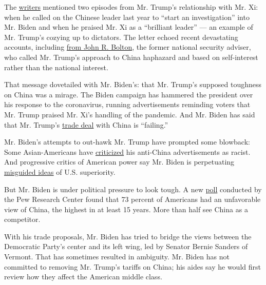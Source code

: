The
\href{https://www.nytimes3xbfgragh.onion/2020/08/20/us/politics/republican-national-security-biden.html}{writers}
mentioned two episodes from Mr. Trump's relationship with Mr. Xi: when
he called on the Chinese leader last year to ``start an investigation''
into Mr. Biden and when he praised Mr. Xi as a ``brilliant leader'' ---
an example of Mr. Trump's cozying up to dictators. The letter echoed
recent devastating accounts, including
\href{https://www.wsj.com/articles/john-bolton-the-scandal-of-trumps-china-policy-11592419564}{from
John R. Bolton}, the former national security adviser, who called Mr.
Trump's approach to China haphazard and based on self-interest rather
than the national interest.

That message dovetailed with Mr. Biden's: that Mr. Trump's supposed
toughness on China was a mirage. The Biden campaign has hammered the
president over his response to the coronavirus, running advertisements
reminding voters that Mr. Trump praised Mr. Xi's handling of the
pandemic. And Mr. Biden has said that Mr. Trump's
\href{https://www.reuters.com/article/us-usa-election-china/biden-says-trumps-china-trade-deal-is-failing-badly-idUSKCN25131X}{trade
deal} with China is ``failing.''

Mr. Biden's attempts to out-hawk Mr. Trump have prompted some blowback:
Some Asian-Americans have
\href{https://www.politico.com/news/2020/04/23/biden-ad-exposes-left-rift-china-202241}{criticized}
his anti-China advertisements as racist. And progressive critics of
American power say Mr. Biden is perpetuating
\href{https://quincyinst.org/2020/03/09/why-joe-bidens-foreign-policy-vision-isnt-so-visionary/}{misguided
ideas} of U.S. superiority.

But Mr. Biden is under political pressure to look tough. A new
\href{https://www.pewresearch.org/global/2020/07/30/americans-fault-china-for-its-role-in-the-spread-of-covid-19/?utm_source=AdaptiveMailer\&utm_medium=email\&utm_campaign=20-08-03\%20US\%20Views\%20of\%20China\%202\%20Gen\%20Distr\&org=982\&lvl=100\&ite=6786\&lea=1495217\&ctr=0\&par=1\&trk=}{poll}
conducted by the Pew Research Center found that 73 percent of Americans
had an unfavorable view of China, the highest in at least 15 years. More
than half see China as a competitor.

With his trade proposals, Mr. Biden has tried to bridge the views
between the Democratic Party's center and its left wing, led by Senator
Bernie Sanders of Vermont. That has sometimes resulted in ambiguity. Mr.
Biden has not committed to removing Mr. Trump's tariffs on China; his
aides say he would first review how they affect the American middle
class.

